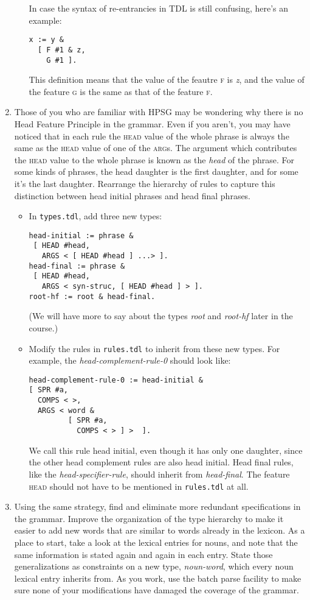 \documentclass[10pt]{article}
\begin{document}
\begin{enumerate}
\begin{itemize}
In case the syntax of re-entrancies in TDL is still confusing, here's an
example:
\begin{verbatim}
x := y &
  [ F #1 & z,
    G #1 ].
\end{verbatim}
This definition means that the value of the feautre \textsc{f} is \emph{z},
and the value of the feature \textsc{g} is the same as that of the feature
\textsc{f}. 
\end{itemize}

\item Those of you who are familiar with HPSG may be wondering why there is no
Head Feature Principle in the grammar. Even if you aren't, you may have
noticed that in each rule the \textsc{head} value of the whole phrase is
always the same as the \textsc{head} value of one of the \textsc{arg}s. The
argument which contributes the \textsc{head} value to the whole phrase is
known as the \emph{head} of the phrase. For some kinds of phrases, the head
daughter is the first daughter, and for some it's the last daughter. Rearrange
the hierarchy of rules to capture this distinction between head initial
phrases and head final phrases.
\begin{itemize} 
\item In \texttt{types.tdl}, add three new types:
\begin{verbatim}
head-initial := phrase &
 [ HEAD #head,
   ARGS < [ HEAD #head ] ...> ].
head-final := phrase &
 [ HEAD #head,
   ARGS < syn-struc, [ HEAD #head ] > ].
root-hf := root & head-final.
\end{verbatim}
(We will have more to say about the types \emph{root} and \emph{root-hf} later
in the course.)
\item Modify the rules in \texttt{rules.tdl} to inherit from these new types.
For example, the \emph{head-complement-rule-0} should look like:
\begin{verbatim}
head-complement-rule-0 := head-initial & 
[ SPR #a,
  COMPS < >,   
  ARGS < word & 
         [ SPR #a, 
           COMPS < > ] >  ].
\end{verbatim}
We call this rule head initial, even though it has only one daughter, since
the other head complement rules are also head initial.  Head final rules, like
the \emph{head-specifier-rule}, should inherit from \emph{head-final}.  The
feature \textsc{head} should not have to be mentioned in \texttt{rules.tdl} at
all.
\end{itemize}
\item Using the same strategy, find and eliminate more redundant
specifications in the grammar.  Improve the organization of the type hierarchy
to make it easier to add new words that are similar to words already in the
lexicon. As a place to start, take a look at the lexical entries for nouns,
and note that the same information is stated again and again in each entry.
State those generalizations as constraints on a new type, \emph{noun-word},
which every noun lexical entry inherits from. As you work, use the batch parse
facility to make sure none of your modifications have damaged the coverage of
the grammar.
\end{enumerate}
\end{document}
